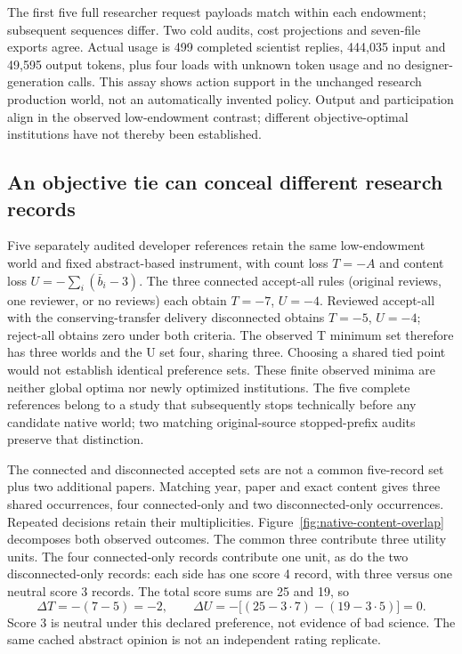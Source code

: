 The first five full researcher request payloads match within each endowment;
subsequent sequences differ. Two cold audits, cost projections and seven-file
exports agree. Actual usage is 499 completed scientist replies, 444,035 input
and 49,595 output tokens, plus four loads with unknown token usage and no
designer-generation calls. This assay shows action support in the unchanged
research production world, not an automatically invented policy. Output and
participation align in the observed low-endowment contrast; different
objective-optimal institutions have not thereby been established.

\subsection{An objective tie can conceal different research records}
Five separately audited developer references retain the same low-endowment
world and fixed abstract-based instrument, with count loss $T=-A$ and
content loss $U=-\sum_i(\bar b_i-3)$. The three connected accept-all rules
(original reviews, one reviewer, or no reviews) each obtain $T=-7$, $U=-4$.
Reviewed accept-all with the conserving-transfer delivery disconnected obtains
$T=-5$, $U=-4$; reject-all obtains zero under both criteria. The observed T
minimum set therefore has three worlds and the U set four, sharing three.
Choosing a shared tied point would not establish identical preference sets.
These finite observed minima are neither global optima nor newly optimized
institutions. The five complete references belong to a study that subsequently
stops technically before any candidate native world; two matching
original-source stopped-prefix audits preserve that distinction.

The connected and disconnected accepted sets are not a common five-record
set plus two additional papers. Matching year, paper and exact content gives
three shared occurrences, four connected-only and two disconnected-only
occurrences. Repeated decisions retain their multiplicities.
Figure~\ref{fig:native-content-overlap} decomposes both observed outcomes.
The common three contribute three utility units. The four connected-only
records contribute one unit, as do the two disconnected-only records: each
side has one score 4 record, with three versus one neutral score 3 records.
The total score sums are 25 and 19, so
\begin{equation}
 \Delta T=-(7-5)=-2,\qquad
 \Delta U=-\big[(25-3\cdot7)-(19-3\cdot5)\big]=0.
 \label{eq:native-content-tie}
\end{equation}
Score 3 is neutral under this declared preference, not evidence of bad science.
The same cached abstract opinion is not an independent rating replicate.

